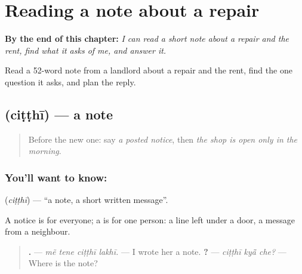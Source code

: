 
\chapter{Reading a note about a repair}
\label{ch:gu-reading-a-note-about-a-repair}

\begin{chapteropening}
\textbf{By the end of this chapter:} \emph{I can read a short note about a repair and the rent, find what it asks of me, and answer it.}

Read a 52-word note from a landlord about a repair and the rent, find the one question it asks, and plan the reply.
\end{chapteropening}

\section[\texorpdfstring{\gu{ચિઠ્ઠી} (ciṭṭhī)}{ચિઠ્ઠી (ciṭṭhī)}]{ (ciṭṭhī) — a note}

\label{lesson:GU-C152-chiththi}



\begin{quote}
Before the new one: say \emph{a posted notice}, then \emph{the shop is open only in the morning}.
\end{quote}

\subsection*{You'll want to know: }
\textbf{} (\emph{ciṭṭhī}) — \textquotedblleft{}a note, a short written message\textquotedblright{}.

A notice is for everyone; a \textbf{} is for one person: a line left under a door, a message from a neighbour.

\begin{quote}
\textbf{   .} — \emph{mẽ tene ciṭṭhī lakhī.} — I wrote her a note. \textbf{  ?} — \emph{ciṭṭhī kyā̃ che?} — Where is the note?
\end{quote}

